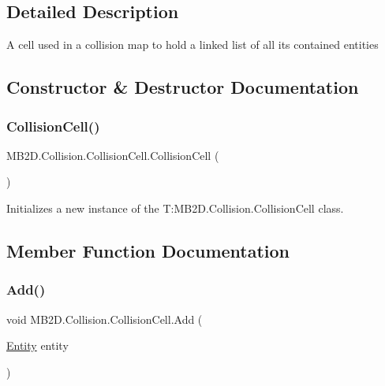 \subsection{Detailed Description}
A cell used in a collision map to hold a linked list of all its contained entities 



\subsection{Constructor \& Destructor Documentation}
\hypertarget{class_m_b2_d_1_1_collision_1_1_collision_cell_a2eefdbb1f60eb35c38c45b4a0f4d939d}{}\label{class_m_b2_d_1_1_collision_1_1_collision_cell_a2eefdbb1f60eb35c38c45b4a0f4d939d} 
\subsubsection{\texorpdfstring{Collision\+Cell()}{CollisionCell()}}
{\footnotesize\ttfamily M\+B2\+D.\+Collision.\+Collision\+Cell.\+Collision\+Cell (\begin{DoxyParamCaption}{ }\end{DoxyParamCaption})\hspace{0.3cm}{\ttfamily [inline]}}



Initializes a new instance of the T\+:\+M\+B2\+D.\+Collision.\+Collision\+Cell class. 



\subsection{Member Function Documentation}
\hypertarget{class_m_b2_d_1_1_collision_1_1_collision_cell_a4fc338d7dbfd7418f5493424c5937213}{}\label{class_m_b2_d_1_1_collision_1_1_collision_cell_a4fc338d7dbfd7418f5493424c5937213} 
\subsubsection{\texorpdfstring{Add()}{Add()}}
{\footnotesize\ttfamily void M\+B2\+D.\+Collision.\+Collision\+Cell.\+Add (\begin{DoxyParamCaption}\item[{\hyperlink{class_m_b2_d_1_1_entity_component_1_1_entity}{Entity}}]{entity }\end{DoxyParamCaption})\hspace{0.3cm}{\ttfamily [inline]}}



